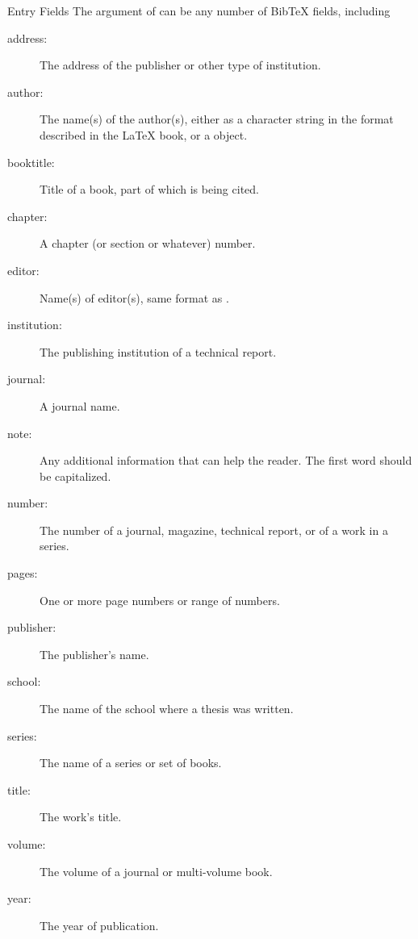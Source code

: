 \begin{Section}{Entry Fields}
The  argument of  can be any number of
BibTeX fields, including
\begin{description}

\item[address:] The address of the publisher or other type of
institution.

\item[author:] The name(s) of the author(s), either 
as a character string in the format described in the LaTeX book,
or a  object.

\item[booktitle:] Title of a book, part of which is being cited.
\item[chapter:] A chapter (or section or whatever) number.

\item[editor:] Name(s) of editor(s), same format as .

\item[institution:] The publishing institution of a technical report.

\item[journal:] A journal name.

\item[note:] Any additional information that can help the reader.
The first word should be capitalized.

\item[number:] The number of a journal, magazine, technical report,
or of a work in a series.

\item[pages:] One or more page numbers or range of numbers.

\item[publisher:] The publisher's name.

\item[school:] The name of the school where a thesis was written.

\item[series:] The name of a series or set of books.

\item[title:] The work's title.

\item[volume:] The volume of a journal or multi-volume book.

\item[year:] The year of publication.

\end{description}

\end{Section}
